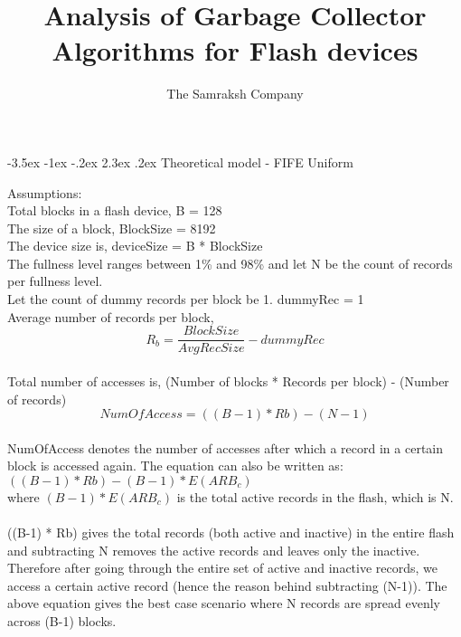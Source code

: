 \documentclass[11pt]{article} %
\title{Analysis of Garbage Collector Algorithms for Flash devices}
\author{The Samraksh Company}
\begin{document}
\maketitle

\makeatletter
\renewcommand\section{\@startsection {section}{1}{\z@}%
    {-3.5ex \@plus -1ex \@minus -.2ex}%
    {2.3ex \@plus.2ex}%
    {\normalfont\large\bfseries}}
\makeatother


\section{Theoretical model - FIFE Uniform}

Assumptions:\\
Total blocks in a flash device, B = 128\\
The size of a block, BlockSize = 8192\\
The device size is, deviceSize = B * BlockSize\\
The fullness level ranges between 1\% and 98\% and let N be the count of records per fullness level.\\
Let the count of dummy records per block be 1. dummyRec = 1\\
Average number of records per block, 
\begin{equation}R_b = \frac{BlockSize}{AvgRecSize} - dummyRec\end{equation}\\


Total number of accesses is, (Number of blocks * Records per block) - (Number of records)\\
\begin{equation}NumOfAccess = ((B-1) * Rb) -  (N-1)\end{equation}\\
NumOfAccess denotes the number of accesses after which a record in a certain block is accessed again. The equation can also be written as: $((B-1) * Rb) - (B-1) * E(ARB_c)$\\
where $(B-1) * E(ARB_c)$ is the total active records in the flash, which is N.\\
\\

((B-1) * Rb) gives the total records (both active and inactive) in the entire flash and subtracting N removes the active records and leaves only the inactive. Therefore after going through the entire set of active and inactive records, we access a certain active record (hence the reason behind subtracting (N-1)). The above equation gives the best case scenario where N records are spread evenly across (B-1) blocks.\\
\\
\end{document}
